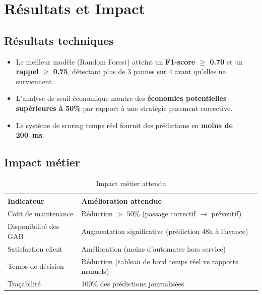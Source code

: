 \documentclass[a4paper,12pt]{report}
\begin{document}
\chapter{Résultats et Impact}

\section{Résultats techniques}

\begin{itemize}
    \item Le meilleur modèle (Random Forest) atteint un \textbf{F1-score $\geq$ 0.70} et un \textbf{rappel $\geq$ 0.75}, détectant plus de 3 pannes sur 4 avant qu'elles ne surviennent.
    \item L'analyse de seuil économique montre des \textbf{économies potentielles supérieures à 50\%} par rapport à une stratégie purement corrective.
    \item Le système de scoring temps réel fournit des prédictions en \textbf{moins de 200~ms}.
\end{itemize}

\section{Impact métier}

\begin{table}[h!]
\centering
\renewcommand{\arraystretch}{1.4}
\begin{tabularx}{\textwidth}{|l|X|}
\hline
\rowcolor{bpmblue!10}
\textbf{Indicateur} & \textbf{Amélioration attendue} \\
\hline
Coût de maintenance & Réduction $>$ 50\% (passage correctif $\rightarrow$ préventif) \\
\hline
Disponibilité des GAB & Augmentation significative (prédiction 48h à l'avance) \\
\hline
Satisfaction client & Amélioration (moins d'automates hors service) \\
\hline
Temps de décision & Réduction (tableau de bord temps réel vs rapports manuels) \\
\hline
Traçabilité & 100\% des prédictions journalisées \\
\hline
\end{tabularx}
\caption{Impact métier attendu}
\end{table}
\end{document}
